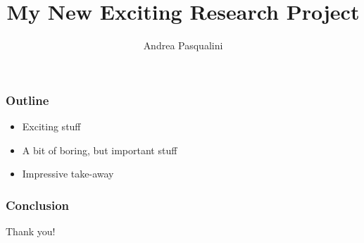 \documentclass[aspectratio=1610]{beamer}
\author{Andrea Pasqualini}
\title{My New Exciting Research Project}
\date{}
\begin{document}
  \begin{frame}
    \maketitle
  \end{frame}

  \begin{frame}
    \frametitle{Outline}

    \begin{itemize}
      \item Exciting stuff
      \item A bit of boring, but important stuff
      \item Impressive take-away
    \end{itemize}

  \end{frame}

  \begin{frame}
    \frametitle{Conclusion}

    \begin{center}
      Thank you!
    \end{center}

  \end{frame}
\end{document}
